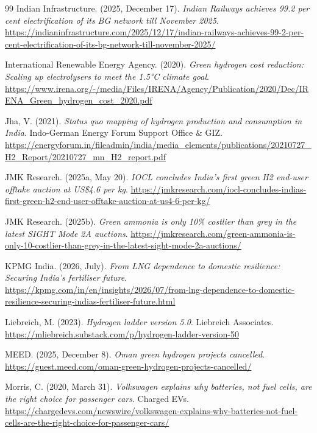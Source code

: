 {\begin{thebibliography}{99}
 Indian Infrastructure. (2025, December 17). \emph{Indian Railways achieves 99.2 per cent electrification of its BG network till November 2025}. \url{https://indianinfrastructure.com/2025/12/17/indian-railways-achieves-99-2-per-cent-electrification-of-its-bg-network-till-november-2025/}

 International Renewable Energy Agency. (2020). \emph{Green hydrogen cost reduction: Scaling up electrolysers to meet the 1.5°C climate goal}. \url{https://www.irena.org/-/media/Files/IRENA/Agency/Publication/2020/Dec/IRENA_Green_hydrogen_cost_2020.pdf}

 Jha, V. (2021). \emph{Status quo mapping of hydrogen production and consumption in India}. Indo-German Energy Forum Support Office \& GIZ. \url{https://energyforum.in/fileadmin/india/media_elements/publications/20210727_H2_Report/20210727_mn_H2_report.pdf}

 JMK Research. (2025a, May 20). \emph{IOCL concludes India's first green H2 end-user offtake auction at US\$4.6 per kg}. \url{https://jmkresearch.com/iocl-concludes-indias-first-green-h2-end-user-offtake-auction-at-us4-6-per-kg/}

 JMK Research. (2025b). \emph{Green ammonia is only 10\% costlier than grey in the latest SIGHT Mode 2A auctions}. \url{https://jmkresearch.com/green-ammonia-is-only-10-costlier-than-grey-in-the-latest-sight-mode-2a-auctions/}

 KPMG India. (2026, July). \emph{From LNG dependence to domestic resilience: Securing India's fertiliser future}. \url{https://kpmg.com/in/en/insights/2026/07/from-lng-dependence-to-domestic-resilience-securing-indias-fertiliser-future.html}

 Liebreich, M. (2023). \emph{Hydrogen ladder version 5.0}. Liebreich Associates. \url{https://mliebreich.substack.com/p/hydrogen-ladder-version-50}

 MEED. (2025, December 8). \emph{Oman green hydrogen projects cancelled}. \url{https://guest.meed.com/oman-green-hydrogen-projects-cancelled/}

 Morris, C. (2020, March 31). \emph{Volkswagen explains why batteries, not fuel cells, are the right choice for passenger cars}. Charged EVs. \url{https://chargedevs.com/newswire/volkswagen-explains-why-batteries-not-fuel-cells-are-the-right-choice-for-passenger-cars/}


\end{thebibliography}}
